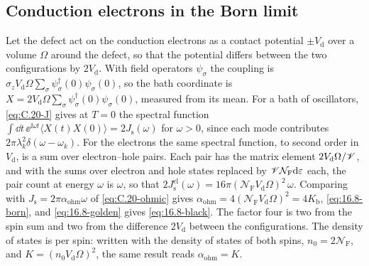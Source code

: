 \subsection*{Conduction electrons in the Born limit}

Let the defect act on the conduction electrons as a contact potential $\pm V_{\mathrm{d}}$ over a volume $\Omega$ around the defect, so that the potential differs between the two configurations by $2V_{\mathrm{d}}$. With field operators $\psi_\sigma$ the coupling is $\sigma_zV_{\mathrm{d}}\Omega\sum_\sigma\psi_\sigma^\dagger(0)\psi_\sigma(0)$, so the bath coordinate is $X = 2V_{\mathrm{d}}\Omega\sum_\sigma\psi_\sigma^\dagger(0)\psi_\sigma(0)$, measured from its mean. For a bath of oscillators, \cref{eq:C.20-J} gives at $T = 0$ the spectral function $\int\dd t\,\ee^{\ii\omega t}\langle X(t)X(0)\rangle = 2J_{\mathrm{s}}(\omega)$ for $\omega > 0$, since each mode contributes $2\pi\lambda_k^2\delta(\omega - \omega_k)$. For the electrons the same spectral function, to second order in $V_{\mathrm{d}}$, is a sum over electron--hole pairs. Each pair has the matrix element $2V_{\mathrm{d}}\Omega/\mathscr{V}$, and with the sums over electron and hole states replaced by $\mathscr{V}\mathcal{N}_{\mathrm{F}}\mathrm{d}\varepsilon$ each, the pair count at energy $\omega$ is $\omega$, so that $2J_{\mathrm{s}}^{\mathrm{el}}(\omega) = 16\pi(\mathcal{N}_{\mathrm{F}}V_{\mathrm{d}}\Omega)^2\,\omega$. Comparing with $J_{\mathrm{s}} = 2\pi\alpha_{\mathrm{ohm}}\omega$ of \cref{eq:C.20-ohmic} gives $\alpha_{\mathrm{ohm}} = 4(\mathcal{N}_{\mathrm{F}}V_{\mathrm{d}}\Omega)^2 = 4K_{\mathrm{b}}$, \cref{eq:16.8-born}, and \cref{eq:16.8-golden} gives \cref{eq:16.8-black}. The factor four is two from the spin sum and two from the difference $2V_{\mathrm{d}}$ between the configurations. The density of states is per spin: written with the density of states of both spins, $n_0 = 2\mathcal{N}_{\mathrm{F}}$, and $K = (n_0V_{\mathrm{d}}\Omega)^2$, the same result reads $\alpha_{\mathrm{ohm}} = K$.

